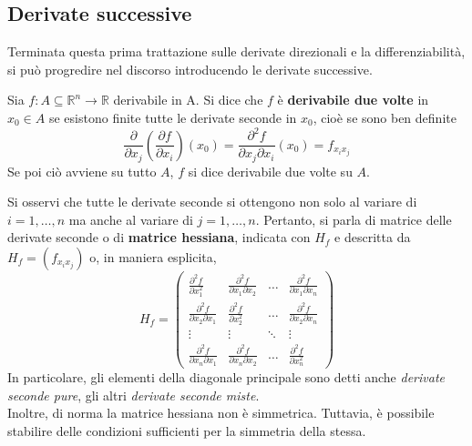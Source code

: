 \subsection{Derivate successive}
Terminata questa prima trattazione sulle derivate direzionali e la differenziabilità, si può progredire nel discorso introducendo le derivate successive.
\begin{definition}
    Sia $f:A \subseteq \mathbb{R}^n \to \mathbb{R}$ derivabile in A. Si dice che $f$ è \textbf{derivabile due volte} in $x_0 \in A$ se esistono finite tutte le derivate seconde in $x_0$, cioè se sono ben definite
    \begin{equation}
        \frac{\partial}{\partial x_j}\left(\frac{\partial f}{\partial x_i}\right)(x_0)=\frac{\partial^2f}{\partial x_j \partial x_i}(x_0)=f_{x_ix_j}
    \end{equation}
    Se poi ciò avviene su tutto $A$, $f$ si dice derivabile due volte su $A$.
\end{definition}
Si osservi che tutte le derivate seconde si ottengono non solo al variare di $i=1, \dots, n$ ma anche al variare di $j=1, \dots, n$. Pertanto, si parla di matrice delle derivate seconde o di \textbf{matrice hessiana}, indicata con $H_f$ e descritta da $H_f=(f_{x_ix_j})$ o, in maniera esplicita,
\begin{equation} \label{Eq: Matrice hessiana}
    H_f = \begin{pmatrix}
    \frac{\partial^2 f}{\partial x_1^2} & \frac{\partial^2 f}{\partial x_1 \partial x_2} & \dots  & \frac{\partial^2 f}{\partial x_1 \partial x_n} \\
    \frac{\partial^2 f}{\partial x_2 \partial x_1} & \frac{\partial^2 f}{\partial x_2^2}  & \dots  & \frac{\partial^2 f}{\partial x_2 \partial x_n} \\
    \vdots & \vdots & \ddots & \vdots \\
    \frac{\partial^2 f}{\partial x_n \partial x_1} & \frac{\partial^2 f}{\partial x_n \partial x_2} & \dots  & \frac{\partial^2 f}{\partial x_n^2}
    \end{pmatrix}
\end{equation}
In particolare, gli elementi della diagonale principale sono detti anche \textit{derivate seconde pure}, gli altri \textit{derivate seconde miste}.\\
Inoltre, di norma la matrice hessiana non è simmetrica. Tuttavia, è possibile stabilire delle condizioni sufficienti per la simmetria della stessa.
